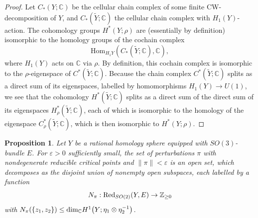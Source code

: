 \documentclass[10pt,a4paper]{amsart}
\newtheorem{proposition}[theorem]{Proposition}
\theoremstyle{definition}
\theoremstyle{remark}
\numberwithin{figure}{qchap}
\begin{document}
\begin{proof}Let $C_*(Y; \mathbb C)$ be the cellular chain complex of some finite CW-decomposition of $Y$, and $C_*(\tilde Y; \mathbb C)$ the cellular chain complex with $H_1(Y)$-action. The cohomology groups $H^*(Y; \rho)$ are (essentially by definition) isomorphic to the homology groups of the cochain complex 
$$\text{Hom}_{H_1 Y}\left(C_*(\tilde Y; \mathbb C), \mathbb C\right),$$
where $H_1(Y)$ acts on $\mathbb C$ via $\rho$. By definition, this cochain complex is isomorphic to the $\rho$-eigenspace of $C^*(\tilde Y; \mathbb C)$. Because the chain complex $C^*(\tilde Y; \mathbb C)$ splits as a direct sum of its eigenspaces, labelled by homomorphisms $H_1(Y) \to U(1)$, we see that the cohomology $H^*(\tilde Y; \mathbb C)$ splits as a direct sum of the direct sum of its eigenspaces $H^*_\rho(\tilde Y; \mathbb C)$, each of which is isomorphic to the homology of the eigenspace $C^*_\rho(\tilde Y; \mathbb C)$, which is then isomorphic to $H^*(Y; \rho)$.
\end{proof}

\begin{proposition}\label{Eigencounting}Let $Y$ be a rational homology sphere equipped with $SO(3)$-bundle $E$. For $\varepsilon > 0$ sufficiently small, the set of perturbations $\pi$ with nondegenerate reducible critical points and $\|\pi\| < \varepsilon$ is an open set, which decomposes as the disjoint union of nonempty open subspaces, each labelled by a function $$N_\pi: \textup{Red}_{SO(2)}(Y,E) \to \mathbb Z_{\geq 0}$$ with $N_\pi(\{z_1, z_2\}) \leq \textup{dim}_{\mathbb C } H^1\!\left(Y; \eta_1 \otimes \eta_2^{-1}\right)$.
\end{proposition}
\end{document}
